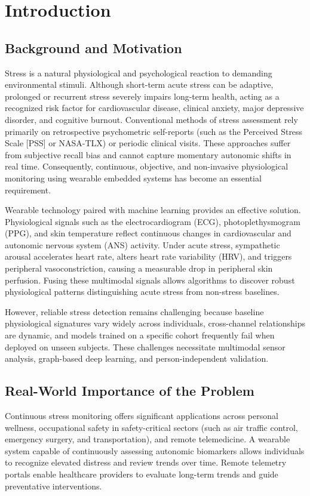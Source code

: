 \documentclass[11pt,a4paper]{article}
\begin{document}
\section{Introduction}

\subsection{Background and Motivation}
Stress is a natural physiological and psychological reaction to demanding environmental stimuli. Although short-term acute stress can be adaptive, prolonged or recurrent stress severely impairs long-term health, acting as a recognized risk factor for cardiovascular disease, clinical anxiety, major depressive disorder, and cognitive burnout. Conventional methods of stress assessment rely primarily on retrospective psychometric self-reports (such as the Perceived Stress Scale [PSS] or NASA-TLX) or periodic clinical visits. These approaches suffer from subjective recall bias and cannot capture momentary autonomic shifts in real time. Consequently, continuous, objective, and non-invasive physiological monitoring using wearable embedded systems has become an essential requirement.

Wearable technology paired with machine learning provides an effective solution. Physiological signals such as the electrocardiogram (ECG), photoplethysmogram (PPG), and skin temperature reflect continuous changes in cardiovascular and autonomic nervous system (ANS) activity. Under acute stress, sympathetic arousal accelerates heart rate, alters heart rate variability (HRV), and triggers peripheral vasoconstriction, causing a measurable drop in peripheral skin perfusion. Fusing these multimodal signals allows algorithms to discover robust physiological patterns distinguishing acute stress from non-stress baselines.

However, reliable stress detection remains challenging because baseline physiological signatures vary widely across individuals, cross-channel relationships are dynamic, and models trained on a specific cohort frequently fail when deployed on unseen subjects. These challenges necessitate multimodal sensor analysis, graph-based deep learning, and person-independent validation.

\subsection{Real-World Importance of the Problem}
Continuous stress monitoring offers significant applications across personal wellness, occupational safety in safety-critical sectors (such as air traffic control, emergency surgery, and transportation), and remote telemedicine. A wearable system capable of continuously assessing autonomic biomarkers allows individuals to recognize elevated distress and review trends over time. Remote telemetry portals enable healthcare providers to evaluate long-term trends and guide preventative interventions.
\end{document}
